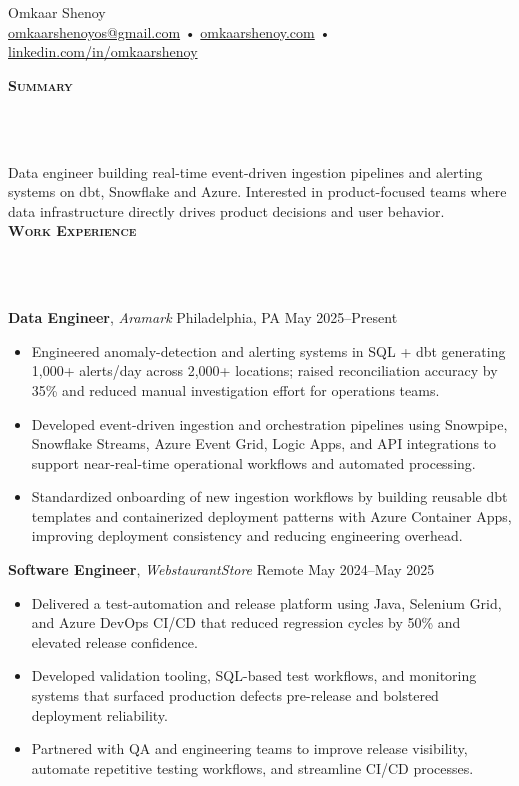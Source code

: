 \documentclass[10pt]{article}
\newcommand{\lineunder} {
    \vspace*{-10pt} \\
    \hspace*{-18pt} \hrulefill \\
    \vspace*{2pt}
}
\newcommand{\header} [1] {
  \vspace*{2pt}
    {\hspace*{-15pt}\textsc{#1}}
    \lineunder
}
\begin{document}
\begin{center}
  {\Huge Omkaar Shenoy} \\

  \href{mailto:omkaarshenoyos@gmail.com}{omkaarshenoyos@gmail.com} \;•\;
  \href{https://omkaarshenoy.com}{omkaarshenoy.com} \;•\;
  \href{https://www.linkedin.com/in/omkaarshenoy}{linkedin.com/in/omkaarshenoy}
\end{center}

\header{\textbf{Summary}}
Data engineer building real-time event-driven ingestion pipelines and alerting systems on dbt, Snowflake and Azure. Interested in product-focused teams where data infrastructure directly drives product decisions and user behavior.
\\
\header{\textbf{Work Experience}}

\textbf{Data Engineer}, \textit{Aramark} \hfill Philadelphia, PA \textbar{} May 2025--Present\\
\vspace{-2mm}
\begin{itemize}[leftmargin=5mm, itemsep=0mm]
  \item Engineered anomaly-detection and alerting systems in SQL + dbt generating 1{,}000+ alerts/day across 2{,}000+ locations; raised reconciliation accuracy by 35\% and reduced manual investigation effort for operations teams.
  \item Developed event-driven ingestion and orchestration pipelines using Snowpipe, Snowflake Streams, Azure Event Grid, Logic Apps, and API integrations to support near-real-time operational workflows and automated processing.
  \item Standardized onboarding of new ingestion workflows by building reusable dbt templates and containerized deployment patterns with Azure Container Apps, improving deployment consistency and reducing engineering overhead.
\end{itemize}

\textbf{Software Engineer}, \textit{WebstaurantStore} \hfill Remote \textbar{} May 2024--May 2025\\
\vspace{-2mm}
\begin{itemize}[leftmargin=5mm, itemsep=0mm]
  \item Delivered a test-automation and release platform using Java, Selenium Grid, and Azure DevOps CI/CD that reduced regression cycles by 50\% and elevated release confidence.
  \item Developed validation tooling, SQL-based test workflows, and monitoring systems that surfaced production defects pre-release and bolstered deployment reliability.
  \item Partnered with QA and engineering teams to improve release visibility, automate repetitive testing workflows, and streamline CI/CD processes.
\end{itemize}
\end{document}
